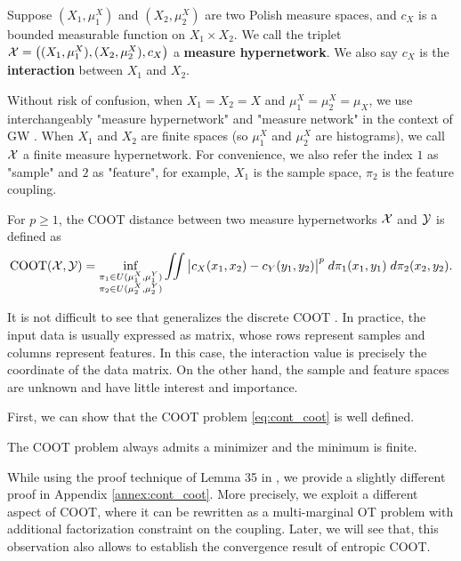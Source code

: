 \begin{definition}
Suppose $(X_1, \mu_1^X)$ and $(X_2, \mu_2^X)$ are two Polish measure spaces,
and $c_X$ is a bounded measurable function on $X_1 \times X_2$.
We call the triplet $\mathcal X = \big((X_1, \mu_1^X), (X_2, \mu_2^X), c_X \big)$
a \textbf{measure hypernetwork}. We also say $c_X$ is the \textbf{interaction}
between $X_1$ and $X_2$.
\end{definition}
Without risk of confusion, when $X_1 = X_2 = X$ and $\mu_1^X = \mu_2^X = \mu_X$,
we use interchangeably "measure hypernetwork" and "measure network"
in the context of GW \citep{Chowdhury19}.
When $X_1$ and $X_2$ are finite spaces (so $\mu_1^X$ and $\mu_2^X$ are histograms),
we call $\mathcal X$ a finite measure hypernetwork. For convenience, we also refer the index $1$ as "sample"
and $2$ as "feature", for example, $X_1$ is the sample space, $\pi_2$ is the feature coupling.
\begin{definition}
  \label{def:cont_coot}
  For $p \geq 1$, the COOT distance between two measure hypernetworks $\mathcal X$ and $\mathcal Y$ is defined as
  \begin{align} \label{eq:cont_coot}
    \text{COOT}(\mathcal X, \mathcal Y) =
    \inf_{\substack{\pi_1 \in U(\mu^X_1, \mu^Y_1) \\
    \pi_2 \in U(\mu^X_2, \mu^Y_2)}} \iint
    \big\vert c_X(x_1, x_2) - c_Y(y_1, y_2) \big\vert^p \; d\pi_1(x_1, y_1) \; d\pi_2(x_2, y_2).
  \end{align}
\end{definition}
It is not difficult to see that  generalizes the discrete COOT \citep{Redko20}.
In practice, the input data is usually expressed as matrix,
whose rows represent samples and columns represent features.
In this case, the interaction value is precisely the coordinate of the data matrix.
On the other hand, the sample and feature spaces are unknown and have little interest and importance.

First, we can show that the COOT problem \eqref{eq:cont_coot} is well defined.
\begin{proposition}
  \label{prop:exist_coot}
  The COOT problem always admits a minimizer and the minimum is finite.
\end{proposition}
While using the proof technique of Lemma 35 in \citep{Chowdhury21b}, we provide a slightly different
proof in Appendix \ref{annex:cont_coot}. More precisely,
we exploit a different aspect of COOT, where it can be rewritten as a multi-marginal OT problem
with additional factorization constraint on the coupling.
Later, we will see that, this observation also allows to establish the
convergence result of entropic COOT.

